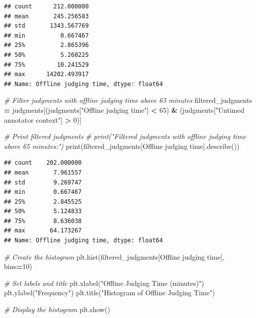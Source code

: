 \documentclass[
]{article}
\newenvironment{Shaded}{\begin{snugshade}}{\end{snugshade}}
\newcommand{\BuiltInTok}[1]{#1}
\newcommand{\CommentTok}[1]{\textcolor[rgb]{0.56,0.35,0.01}{\textit{#1}}}
\newcommand{\DecValTok}[1]{\textcolor[rgb]{0.00,0.00,0.81}{#1}}
\newcommand{\NormalTok}[1]{#1}
\newcommand{\OperatorTok}[1]{\textcolor[rgb]{0.81,0.36,0.00}{\textbf{#1}}}
\newcommand{\StringTok}[1]{\textcolor[rgb]{0.31,0.60,0.02}{#1}}
\begin{document}
\begin{verbatim}
## count      212.000000
## mean       245.256583
## std       1343.567769
## min          0.667467
## 25%          2.865396
## 50%          5.260225
## 75%         10.241529
## max      14202.493917
## Name: Offline judging time, dtype: float64
\end{verbatim}

\begin{Shaded}
\begin{Highlighting}[]
\CommentTok{\# Filter judgments with offline judging time above 65 minutes}
\NormalTok{filtered\_judgments }\OperatorTok{=}\NormalTok{ judgments[(judgments[}\StringTok{"Offline judging time"}\NormalTok{] }\OperatorTok{\textless{}} \DecValTok{65}\NormalTok{) }\OperatorTok{\&}\NormalTok{ (judgments[}\StringTok{"Untimed annotator context"}\NormalTok{] }\OperatorTok{\textgreater{}} \DecValTok{0}\NormalTok{)]}

\CommentTok{\# Print filtered judgments}
\CommentTok{\# print("Filtered judgments with offline judging time above 65 minutes:")}
\BuiltInTok{print}\NormalTok{(filtered\_judgments[}\StringTok{\textquotesingle{}Offline judging time\textquotesingle{}}\NormalTok{].describe())}
\end{Highlighting}
\end{Shaded}

\begin{verbatim}
## count    202.000000
## mean       7.961557
## std        9.269747
## min        0.667467
## 25%        2.845525
## 50%        5.124833
## 75%        8.636038
## max       64.173267
## Name: Offline judging time, dtype: float64
\end{verbatim}

\begin{Shaded}
\begin{Highlighting}[]
\CommentTok{\# Create the histogram}
\NormalTok{plt.hist(filtered\_judgments[}\StringTok{\textquotesingle{}Offline judging time\textquotesingle{}}\NormalTok{], bins}\OperatorTok{=}\DecValTok{10}\NormalTok{)}

\CommentTok{\# Set labels and title}
\NormalTok{plt.xlabel(}\StringTok{"Offline Judging Time (minutes)"}\NormalTok{)}
\NormalTok{plt.ylabel(}\StringTok{"Frequency"}\NormalTok{)}
\NormalTok{plt.title(}\StringTok{"Histogram of Offline Judging Time"}\NormalTok{)}

\CommentTok{\# Display the histogram}
\NormalTok{plt.show()}
\end{Highlighting}
\end{Shaded}
\end{document}
